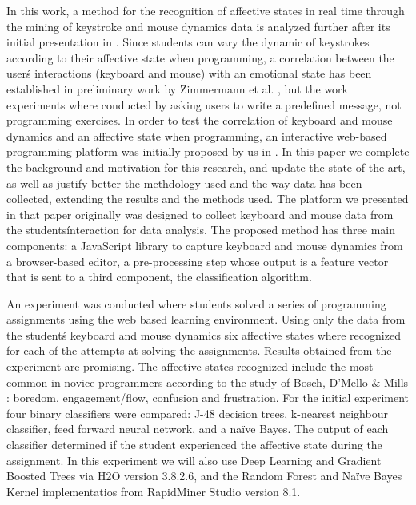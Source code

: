 \documentclass[a4paper,twoside]{article}
\begin{document}
In this work, a method for the recognition of affective states in real
time through the
mining of keystroke and mouse dynamics data is analyzed further after
its initial presentation in \cite{ijcci17}.
Since students can vary the dynamic of keystrokes according
to their affective state when programming, a correlation between the
user\'s interactions (keyboard and mouse) with an emotional state has been
established in preliminary work by Zimmermann
et al. \cite{zimmermann2003affective}, but the work experiments where
conducted by asking users to write a predefined message, not programming
exercises.
In order to test the correlation of keyboard and mouse dynamics and an
affective state when programming, an interactive web-based
programming platform was initially proposed by us in
\cite{ijcci17}. In this paper we complete the background and
motivation for this research, and update the state of the art, as well
as justify better the methdology used and the way data has been
collected, extending the results and the methods used. The platform we
presented in that paper originally was 
designed to collect keyboard and mouse data 
from the students\' interaction for data analysis. The proposed method
has three main components: a JavaScript library to capture keyboard
and mouse dynamics from a browser-based editor, a pre-processing step
whose output is a feature vector that is sent to a third component,
the classification algorithm.

An experiment was conducted where students solved a series of programming
assignments using the web based learning environment. Using only the
data from the student\'s keyboard and mouse dynamics six affective
states where recognized for each of the attempts at solving the
assignments. Results obtained from the experiment are promising. The
affective states recognized include the most common in novice
programmers according to the study of Bosch, D'Mello \& Mills
\cite{bixler2013detecting}: boredom, engagement/flow, confusion and
frustration. For the initial experiment \cite{ijcci17} 
four binary classifiers were compared: J-48 decision trees, k-nearest neighbour
classifier, feed forward neural network, and a na\"ive Bayes. The output of each
classifier determined if the student experienced the affective state during the
assignment. In this experiment we will also use 
Deep Learning \cite{candel2016deep} and  Gradient Boosted Trees 
via H2O version 3.8.2.6, and the Random Forest and Na\"ive Bayes Kernel 
implementatios from RapidMiner Studio version 8.1.
\end{document}
